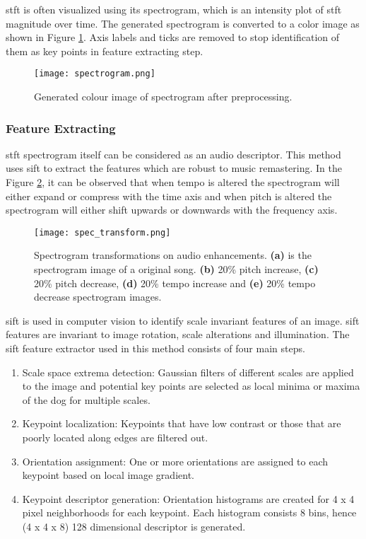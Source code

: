 \gls{stft} is often visualized using its spectrogram\cite{Kehtarnavaz2008}, which is an intensity plot of \gls{stft} magnitude over time. 
The generated spectrogram is converted to a color image as shown in Figure \ref{fig:spectrogram}. Axis labels and ticks are removed to stop
identification of them as key points in feature extracting step. 

\begin{figure}[h]
  \centering
  \texttt{[image: spectrogram.png]}
  \caption{Generated colour image of spectrogram after preprocessing.}
  \label{fig:spectrogram}
\end{figure}

\subsubsection{Feature Extracting}

\gls{stft} spectrogram itself can be considered as an audio descriptor\cite{Ke2005}. This method uses \gls{sift}\cite{Lowe2004} to extract 
the features which are robust to music remastering. In the Figure \ref{fig:compare_spectrogram}, it can be observed that when tempo is
altered the spectrogram will either expand or compress with the time axis and when pitch is altered the spectrogram will either shift upwards or 
downwards with the frequency axis. 

\begin{figure}[h]
  \centering
  \texttt{[image: spec\_transform.png]}
  \caption{Spectrogram transformations on audio enhancements. \textbf{(a)} is the spectrogram image of a original song. \textbf{(b)} 20\% 
  pitch increase, \textbf{(c)} 20\% pitch decrease, \textbf{(d)} 20\% tempo increase and \textbf{(e)} 20\% tempo decrease spectrogram images.}
  \label{fig:compare_spectrogram}
\end{figure}

\gls{sift} is used in computer vision to identify scale invariant features of an image. \gls{sift} features are invariant to image rotation,
scale alterations and illumination\cite{Lowe2004}. The \gls{sift} feature extractor used in this method consists of four main steps.
\begin{enumerate}
  \item Scale space extrema detection: Gaussian filters of different scales are applied to the image and potential key points are selected
  as local minima or maxima of the \gls{dog} for multiple scales.
  \item Keypoint localization: Keypoints that have low contrast or those that are poorly located along edges
  are filtered out.
  \item Orientation assignment: One or more orientations are assigned to each keypoint based on local image gradient. 
  \item Keypoint descriptor generation: Orientation histograms are created for 4 x 4 pixel neighborhoods for each keypoint.
  Each histogram consists 8 bins, hence (4 x 4 x 8) 128 dimensional descriptor is generated.
\end{enumerate}

